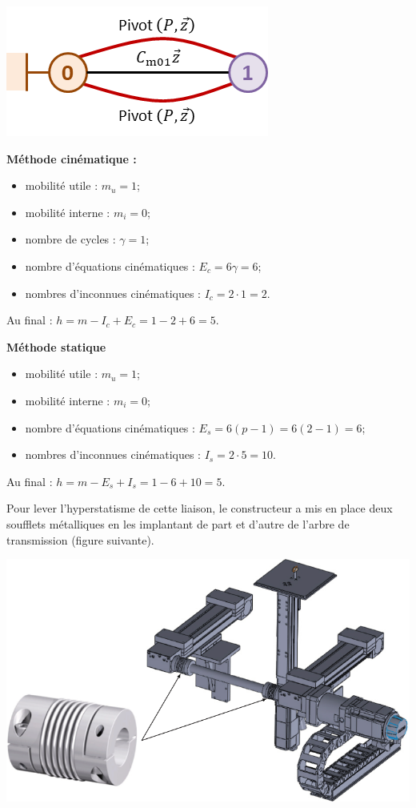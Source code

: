 \documentclass[10pt,fleqn]{article} %
\begin{document}
\begin{multicols}{2}
\begin{corrige}
\begin{center}
\includegraphics[width=.5\linewidth]{images/cor_01}
\end{center}


\textbf{Méthode cinématique :}
\begin{itemize}
\item mobilité utile : $m_u=1$;
\item mobilité interne : $m_i=0$;
\item nombre de cycles : $\gamma = 1$;
\item nombre d'équations cinématiques : $E_c=6\gamma = 6$;
\item nombres d'inconnues cinématiques : $I_c=2\cdot 1=2$.
\end{itemize}
Au final : $h=m-I_c+E_c=1-2+6=5$.

\textbf{Méthode statique}
\begin{itemize}
\item mobilité utile : $m_u=1$;
\item mobilité interne : $m_i=0$;
\item nombre d'équations cinématiques : $E_s=6(p-1)=6(2-1)= 6$;
\item nombres d'inconnues cinématiques : $I_s=2\cdot 5 = 10$.
\end{itemize}
Au final : $h=m-E_s+I_s=1-6+10=5$.

\end{corrige}
\else
\fi

\ifprof
\else
Pour lever l’hyperstatisme de cette liaison, le constructeur a mis en place deux soufflets métalliques en les implantant de part et d’autre de l’arbre de transmission (figure suivante).

\begin{center}
\includegraphics[width=\linewidth]{images/fig_06}
\end{center}


\end{multicols}
\end{document}
